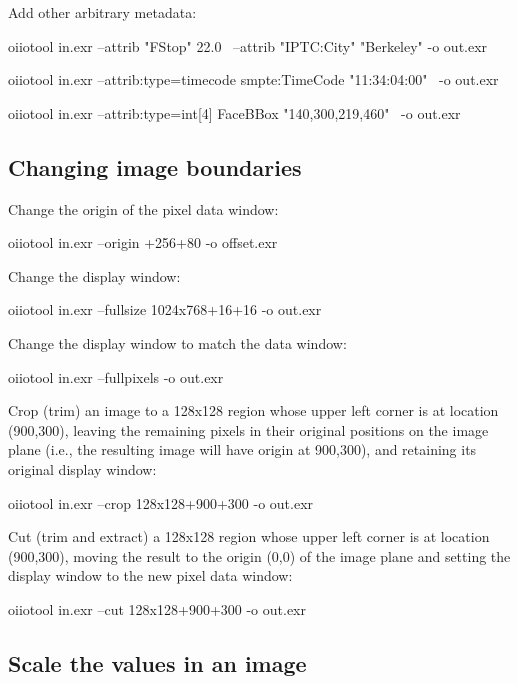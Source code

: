 \noindent Add other arbitrary metadata:
\begin{code}
    oiiotool in.exr --attrib "FStop" 22.0 \
            --attrib "IPTC:City" "Berkeley" -o out.exr

    oiiotool in.exr --attrib:type=timecode smpte:TimeCode "11:34:04:00" \
            -o out.exr

    oiiotool in.exr --attrib:type=int[4] FaceBBox "140,300,219,460" \
            -o out.exr
\end{code}


\subsection*{Changing image boundaries}

\noindent Change the origin of the pixel data window:
\begin{code}
    oiiotool in.exr --origin +256+80 -o offset.exr
\end{code}

\noindent Change the display window:
\begin{code}
    oiiotool in.exr --fullsize 1024x768+16+16 -o out.exr
\end{code}

\noindent Change the display window to match the data window:
\begin{code}
    oiiotool in.exr --fullpixels -o out.exr
\end{code}

\noindent Crop (trim) an image to a 128x128 region whose upper left corner
is at location (900,300), leaving the remaining pixels in their original
positions on the image plane (i.e., the resulting image will have origin at
900,300), and retaining its original display window:
\begin{code}
    oiiotool in.exr --crop 128x128+900+300 -o out.exr
\end{code}

\noindent Cut (trim and extract) a 128x128 region whose upper left corner
is at location (900,300), moving the result to the origin (0,0) of the image
plane and setting the display window to the new pixel data window:
\begin{code}
    oiiotool in.exr --cut 128x128+900+300 -o out.exr
\end{code}


\subsection*{Scale the values in an image}

